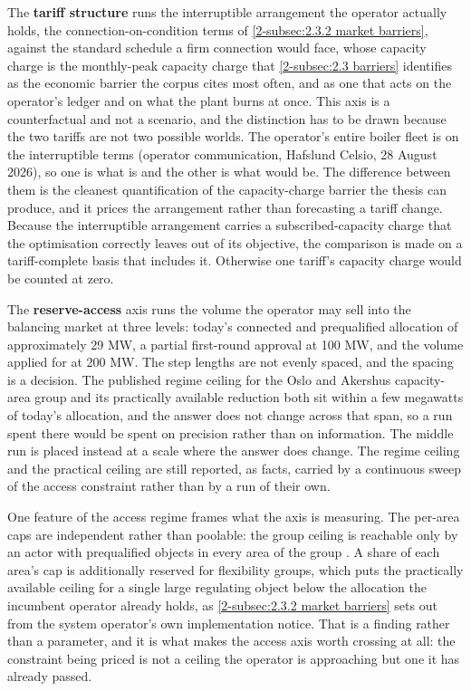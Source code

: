 The \textbf{tariff structure} runs the interruptible arrangement the operator actually holds, the connection-on-condition terms of \autoref{2-subsec:2.3.2 market barriers}, against the standard schedule a firm connection would face, whose capacity charge is the monthly-peak capacity charge that \autoref{2-subsec:2.3 barriers} identifies as the economic barrier the corpus cites most often, and as one that acts on the operator's ledger and on what the plant burns at once. This axis is a counterfactual and not a scenario, and the distinction has to be drawn because the two tariffs are not two possible worlds. The operator's entire boiler fleet is on the interruptible terms (operator communication, Hafslund Celsio, 28 August 2026), so one is what is and the other is what would be. The difference between them is the cleanest quantification of the capacity-charge barrier the thesis can produce, and it prices the arrangement rather than forecasting a tariff change. Because the interruptible arrangement carries a subscribed-capacity charge that the optimisation correctly leaves out of its objective, the comparison is made on a tariff-complete basis that includes it. Otherwise one tariff's capacity charge would be counted at zero.

The \textbf{reserve-access} axis runs the volume the operator may sell into the balancing market at three levels: today's connected and prequalified allocation of approximately 29 MW, a partial first-round approval at 100 MW, and the volume applied for at 200 MW. The step lengths are not evenly spaced, and the spacing is a decision. The published regime ceiling for the Oslo and Akershus capacity-area group and its practically available reduction both sit within a few megawatts of today's allocation, and the answer does not change across that span, so a run spent there would be spent on precision rather than on information. The middle run is placed instead at a scale where the answer does change. The regime ceiling and the practical ceiling are still reported, as facts, carried by a continuous sweep of the access constraint rather than by a run of their own.

One feature of the access regime frames what the axis is measuring. The per-area caps are independent rather than poolable: the group ceiling is reachable only by an actor with prequalified objects in every area of the group \cite{statnett_innforing_2026}. A share of each area's cap is additionally reserved for flexibility groups, which puts the practically available ceiling for a single large regulating object below the allocation the incumbent operator already holds, as \autoref{2-subsec:2.3.2 market barriers} sets out from the system operator's own implementation notice. That is a finding rather than a parameter, and it is what makes the access axis worth crossing at all: the constraint being priced is not a ceiling the operator is approaching but one it has already passed.

